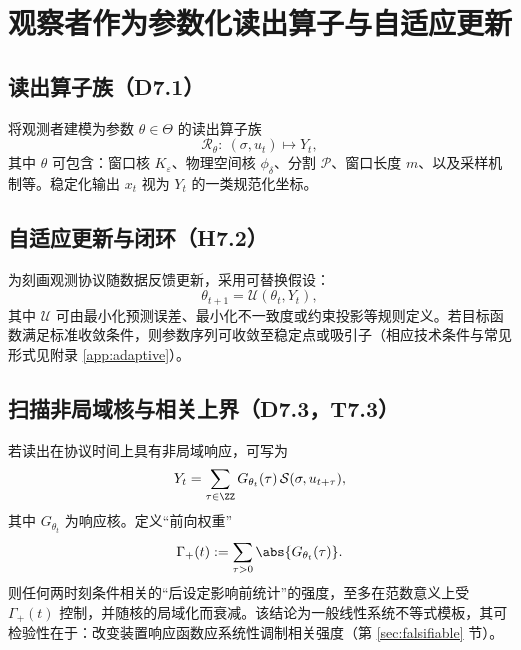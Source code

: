 \section{观察者作为参数化读出算子与自适应更新}

\subsection{读出算子族（D7.1）}

将观测者建模为参数 $\theta\in\Theta$ 的读出算子族
\[
\mathcal{R}_{\theta}:\ (\sigma,u_t)\mapsto Y_t,
\]
其中 $\theta$ 可包含：窗口核 $K_{\varepsilon}$、物理空间核 $\phi_{\delta}$、分割 $\mathcal{P}$、窗口长度 $m$、以及采样机制等。稳定化输出 $x_t$ 视为 $Y_t$ 的一类规范化坐标。

\subsection{自适应更新与闭环（H7.2）}

为刻画观测协议随数据反馈更新，采用可替换假设：
\[
\theta_{t+1}=\mathcal{U}(\theta_t,Y_t),
\]
其中 $\mathcal{U}$ 可由最小化预测误差、最小化不一致度或约束投影等规则定义。若目标函数满足标准收敛条件，则参数序列可收敛至稳定点或吸引子（相应技术条件与常见形式见附录 \ref{app:adaptive}）。

\subsection{扫描非局域核与相关上界（D7.3，T7.3）}

若读出在协议时间上具有非局域响应，可写为
\[
Y_t=\sum_{\tau\in\ZZ} G_{\theta_t}(\tau)\,\mathcal{S}(\sigma,u_{t+\tau}),
\]
其中 $G_{\theta_t}$ 为响应核。定义“前向权重”
\[
\Gamma_+(t):=\sum_{\tau>0}\abs{G_{\theta_t}(\tau)}.
\]
则任何两时刻条件相关的“后设定影响前统计”的强度，至多在范数意义上受 $\Gamma_+(t)$ 控制，并随核的局域化而衰减。该结论为一般线性系统不等式模板，其可检验性在于：改变装置响应函数应系统性调制相关强度（第 \ref{sec:falsifiable} 节）。


